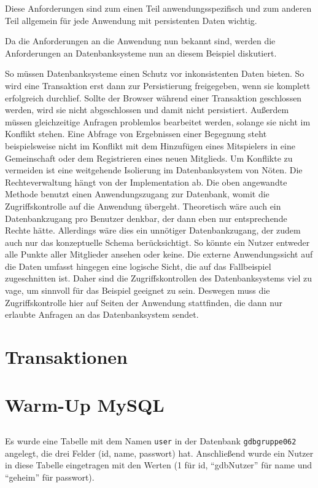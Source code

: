 \documentclass[ngerman]{gdb-aufgabenblatt}
\begin{document}
		Diese Anforderungen sind zum einen Teil anwendungsspezifisch und zum anderen Teil allgemein für jede Anwendung mit persistenten Daten wichtig. 
		
		Da die Anforderungen an die Anwendung nun bekannt sind, werden die Anforderungen an Datenbanksysteme nun an diesem Beispiel diskutiert.
		
		So müssen Datenbanksysteme einen Schutz vor inkonsistenten Daten bieten. So wird eine Transaktion erst dann zur Persistierung freigegeben, wenn sie komplett erfolgreich durchlief. Sollte der Browser während einer Transaktion geschlossen werden, wird sie nicht abgeschlossen und damit nicht persistiert.
		Außerdem müssen gleichzeitige Anfragen problemlos bearbeitet werden, solange sie nicht im Konflikt stehen. Eine Abfrage von Ergebnissen einer Begegnung steht beispielsweise nicht im Konflikt mit dem Hinzufügen eines Mitspielers in eine Gemeinschaft oder dem Registrieren eines neuen Mitglieds. Um Konflikte zu vermeiden ist eine weitgehende Isolierung im Datenbanksystem von Nöten.
		Die Rechteverwaltung hängt von der Implementation ab. Die oben angewandte Methode benutzt einen Anwendungszugang zur Datenbank, womit die Zugriffskontrolle auf die Anwendung übergeht. Theoretisch wäre auch ein Datenbankzugang pro Benutzer denkbar, der dann eben nur entsprechende Rechte hätte. Allerdings wäre dies ein unnötiger Datenbankzugang, der zudem auch nur das konzeptuelle Schema berücksichtigt. So könnte ein Nutzer entweder alle Punkte aller Mitglieder ansehen oder keine. Die externe Anwendungssicht auf die Daten umfasst hingegen eine logische Sicht, die auf das Fallbeispiel zugeschnitten ist. Daher sind die Zugriffskontrollen des Datenbanksystems viel zu vage, um sinnvoll für das Beispiel geeignet zu sein. Deswegen muss die Zugriffskontrolle hier auf Seiten der Anwendung stattfinden, die dann nur erlaubte Anfragen an das Datenbanksystem sendet.
		
		
\section{Transaktionen}


\section{Warm-Up MySQL}
	\subsection{} %
		Es wurde eine Tabelle mit dem Namen \texttt{user} in der Datenbank \texttt{gdb\textunderscore gruppe062} angelegt, die drei Felder (id, name, passwort) hat. Anschließend wurde ein Nutzer in diese Tabelle eingetragen mit den Werten (1 für id, "`gdbNutzer"' für name und "`geheim"' für passwort).
\end{document}
